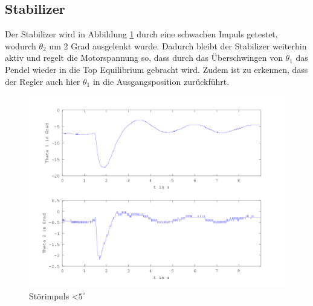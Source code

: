 \subsection{Stabilizer}

Der Stabilizer wird in Abbildung \ref{fig.Stabilisierer-Plot} durch eine schwachen Impuls getestet, wodurch $\theta_2$ um 2 Grad ausgelenkt wurde. Dadurch bleibt der Stabilizer weiterhin aktiv und regelt die Motorspannung so, dass durch das Überschwingen von $ \theta_1$ das Pendel wieder in die Top Equilibrium gebracht wird. Zudem ist zu erkennen, dass der Regler auch hier $ \theta_1$ in die Ausgangsposition zurückführt.

\begin{figure}[htbp]
	\centering
	\includegraphics[width=1.\textwidth]{Grafiken/Stab_lang.png}
	\caption{Störimpuls \textless $5^{\circ}$}
	\label{fig.Stabilisierer-Plot}
\end{figure}


